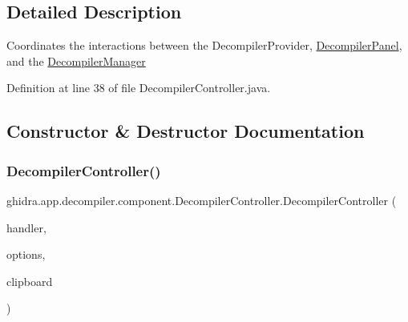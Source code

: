 \subsection{Detailed Description}
Coordinates the interactions between the Decompiler\+Provider, \mbox{\hyperlink{classghidra_1_1app_1_1decompiler_1_1component_1_1_decompiler_panel}{Decompiler\+Panel}}, and the \mbox{\hyperlink{classghidra_1_1app_1_1decompiler_1_1component_1_1_decompiler_manager}{Decompiler\+Manager}} 

Definition at line 38 of file Decompiler\+Controller.\+java.



\subsection{Constructor \& Destructor Documentation}
\mbox{\label{classghidra_1_1app_1_1decompiler_1_1component_1_1_decompiler_controller_a9e275629c64dc9e5a0672069c97b7d9f}} 
\subsubsection{\texorpdfstring{DecompilerController()}{DecompilerController()}}
{\footnotesize\ttfamily ghidra.\+app.\+decompiler.\+component.\+Decompiler\+Controller.\+Decompiler\+Controller (\begin{DoxyParamCaption}\item[{\mbox{\hyperlink{interfaceghidra_1_1app_1_1decompiler_1_1component_1_1_decompiler_callback_handler}{Decompiler\+Callback\+Handler}}}]{handler,  }\item[{\mbox{\hyperlink{classghidra_1_1app_1_1decompiler_1_1_decompile_options}{Decompile\+Options}}}]{options,  }\item[{\mbox{\hyperlink{classghidra_1_1app_1_1plugin_1_1core_1_1decompile_1_1_decompile_clipboard_provider}{Decompile\+Clipboard\+Provider}}}]{clipboard }\end{DoxyParamCaption})\hspace{0.3cm}{\ttfamily [inline]}}



